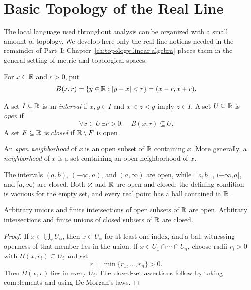 \section{Basic Topology of the Real Line}
\label{sec:real-line-topology}

The local language used throughout analysis can be organized with a small
amount of topology.  We develop here only the real-line notions needed in
the remainder of Part~I; Chapter~\ref{ch:topology-linear-algebra} places them
in the general setting of metric and topological spaces.

\begin{definition}
For $x\in\mathbb{R}$ and $r>0$, put
\[
B(x,r)=\left\{y\in\mathbb{R}:|y-x|<r\right\}=(x-r,x+r).
\]
\end{definition}

\begin{definition}
A set $I\subseteq\mathbb{R}$ is an \emph{interval} if $x,y\in I$ and $x<z<y$
imply $z\in I$.  A set $U\subseteq\mathbb{R}$ is \emph{open} if
\[
\forall x\in U\ \exists r>0:\quad B(x,r)\subseteq U.
\]
A set $F\subseteq\mathbb{R}$ is \emph{closed} if $\mathbb{R}\setminus F$ is open.
\end{definition}

An \emph{open neighborhood} of $x$ is an open subset of $\mathbb{R}$ containing
$x$. More generally, a \emph{neighborhood} of $x$ is a set containing an
open neighborhood of $x$.

The intervals $(a,b)$, $(-\infty,a)$, and $(a,\infty)$ are open, while
$[a,b]$, $(-\infty,a]$, and $[a,\infty)$ are closed.  Both $\varnothing$
and $\mathbb{R}$ are open and closed: the defining condition is vacuous for the
empty set, and every real point has a ball contained in $\mathbb{R}$.

\begin{proposition}
Arbitrary unions and finite intersections of open subsets of $\mathbb{R}$ are
open.  Arbitrary intersections and finite unions of closed subsets of
$\mathbb{R}$ are closed.
\end{proposition}
\begin{proof}
If $x\in\bigcup_\alpha U_\alpha$, then $x\in U_\alpha$ for at least one
index, and a ball witnessing openness of that member lies in the union.
If $x\in U_1\cap\cdots\cap U_n$, choose radii $r_i>0$ with
$B(x,r_i)\subseteq U_i$ and set
\[
r=\min\{r_1,\ldots,r_n\}>0.
\]
Then $B(x,r)$ lies in every $U_i$.  The closed-set assertions follow by
taking complements and using De Morgan's laws.
\end{proof}

